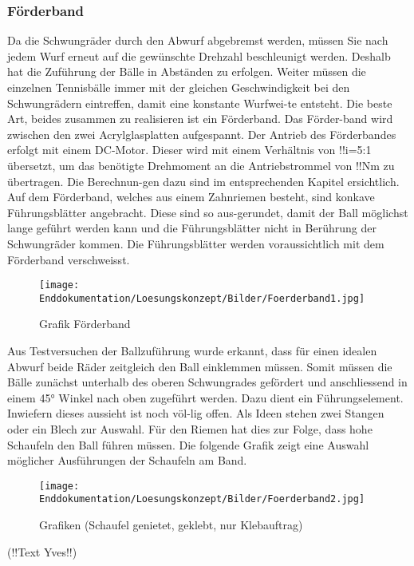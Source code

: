 \subsubsection{Förderband}
Da die Schwungräder durch den Abwurf abgebremst werden, müssen Sie nach jedem Wurf erneut auf die gewünschte Drehzahl beschleunigt werden. Deshalb hat die Zuführung der Bälle in Abständen zu erfolgen. Weiter müssen die einzelnen Tennisbälle immer mit der gleichen Geschwindigkeit bei den Schwungrädern eintreffen, damit eine konstante Wurfwei-te entsteht. Die beste Art, beides zusammen zu realisieren ist ein Förderband. Das Förder-band wird zwischen den zwei Acrylglasplatten aufgespannt. Der Antrieb des Förderbandes erfolgt mit einem DC-Motor. Dieser wird mit einem Verhältnis von !!i=5:1 übersetzt, um das benötigte Drehmoment an die Antriebstrommel von !!Nm zu übertragen. Die Berechnun-gen dazu sind im entsprechenden Kapitel ersichtlich. Auf dem Förderband, welches aus einem Zahnriemen besteht, sind konkave Führungsblätter angebracht. Diese sind so aus-gerundet, damit der Ball möglichst lange geführt werden kann und die Führungsblätter nicht in Berührung der Schwungräder kommen. Die Führungsblätter werden voraussichtlich mit dem Förderband verschweisst.
\begin{figure}
	\centering
	\texttt{[image: Enddokumentation/Loesungskonzept/Bilder/Foerderband1.jpg]}
	\caption{Grafik Förderband}
	\label{fig:Grafik Förderband}	
\end{figure}
Aus Testversuchen der Ballzuführung wurde erkannt, dass für einen idealen Abwurf beide Räder zeitgleich den Ball einklemmen müssen. Somit müssen die Bälle zunächst unterhalb des oberen Schwungrades gefördert und anschliessend in einem 45° Winkel nach oben zugeführt werden. Dazu dient ein Führungselement. Inwiefern dieses aussieht ist noch völ-lig offen. Als Ideen stehen zwei Stangen oder ein Blech zur Auswahl. Für den Riemen hat dies zur Folge, dass hohe Schaufeln den Ball führen müssen. Die folgende Grafik zeigt eine Auswahl möglicher Ausführungen der Schaufeln am Band.
\begin{figure}
	\centering
	\texttt{[image: Enddokumentation/Loesungskonzept/Bilder/Foerderband2.jpg]}
	\caption{Grafiken (Schaufel genietet, geklebt, nur Klebauftrag)}
	\label{fig:Grafiken (Schaufel genietet, geklebt, nur Klebauftrag)}	
\end{figure}
(!!Text Yves!!)